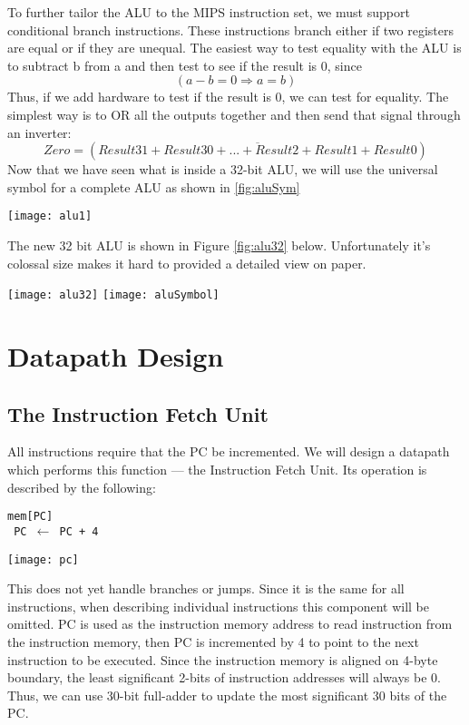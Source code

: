 \documentclass[12pt]{report}
\newcommand{\mychapter}[2]{
    \setcounter{chapter}{#1}
    \setcounter{section}{0}
    \chapter*{#2}
    \addcontentsline{toc}{chapter}{#2}
}
\begin{document}
To further tailor the ALU to the MIPS instruction set, we must support
conditional branch instructions. These instructions branch either if two registers are equal or if they are unequal. The easiest way to test equality with the ALU is to subtract b from a and then test to see if the result is 0, since
$$(a - b= 0 \Longrightarrow a=b)$$
Thus, if we add hardware to test if the result is 0, we can test for equality. The
simplest way is to OR all the outputs together and then send that signal through an inverter:
$$Zero= (\overline{Result31 + Result30 + ...+Result2 + Result1 + Result0} )$$
Now that we have seen what is inside a 32-bit ALU, we will use the
universal symbol for a complete ALU as shown in \ref{fig:aluSym}
\begin{center}
		\texttt{[image: alu1]}%
					\label{fig:alu1}%
	\end{center}
The new 32 bit ALU is shown in Figure \ref{fig:alu32} below. Unfortunately  it's colossal size makes it hard  to provided a detailed view on paper.
\begin{center}
		\texttt{[image: alu32]}%
					\label{fig:alu32}%
		\texttt{[image: aluSymbol]}%
					\label{fig:aluSym}%
	\end{center}
	
   \mychapter{4}{Datapath Design}
   \section{The Instruction Fetch Unit}
   All instructions require that the PC be incremented.
We will design a datapath which performs this function — the Instruction
Fetch Unit. Its operation is described by the following:

\begin{center}
{\hspace{25 mm} \large \texttt{mem[PC]} \hspace{25 mm} \\
 \texttt{ PC $\leftarrow$ PC + 4} \hspace{25 mm} }
\end{center}
\begin{center}
		\texttt{[image: pc]}%
					\label{fig:pc}%
	\end{center}
  This does not yet handle branches or jumps.
Since it is the same for all instructions, when describing individual
instructions this component will be omitted. PC is used as the instruction memory address to read instruction from the instruction memory, then PC is incremented by 4 to point to the next instruction to be executed. Since the instruction memory is aligned on 4-byte boundary, the least significant 2-bits of instruction addresses will always be 0. Thus, we can use 30-bit full-adder to update the most significant 30 bits of the PC.
\newpage
\end{document}
